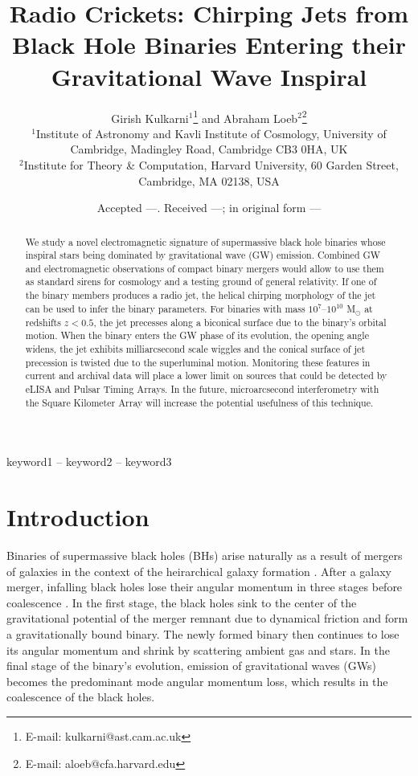 \documentclass[a4paper,fleqn,usenatbib]{mnras}
\title[Chirping Jets from Black Hole Binaries]{Radio Crickets:
  Chirping Jets from Black Hole Binaries Entering their Gravitational
  Wave Inspiral}
\author[Kulkarni and Loeb]{
Girish Kulkarni$^{1}$\thanks{E-mail: kulkarni@ast.cam.ac.uk}
and Abraham Loeb$^{2}$\thanks{E-mail: aloeb@cfa.harvard.edu}
\\
$^{1}$Institute of Astronomy and Kavli
  Institute of Cosmology, University of Cambridge, Madingley Road,
  Cambridge CB3 0HA, UK\\ 
$^{2}$Institute for Theory \& Computation,
  Harvard University, 60 Garden Street, Cambridge, MA 02138, USA\\ 
}
\date{Accepted ---. Received ---; in original form ---}
\begin{document}
\label{firstpage}
\pagerange{\pageref{firstpage}--\pageref{lastpage}}
\maketitle

\begin{abstract}
  We study a novel electromagnetic signature of supermassive black
  hole binaries whose inspiral stars being dominated by gravitational
  wave (GW) emission. Combined GW and electromagnetic observations of
  compact binary mergers would allow to use them as standard sirens
  for cosmology and a testing ground of general relativity.  If one of
  the binary members produces a radio jet, the helical chirping
  morphology of the jet can be used to infer the binary parameters.
  For binaries with mass $10^7$--$10^{10}$ M$_\odot$ at redshifts
  $z<0.5$, the jet precesses along a biconical surface due to the
  binary's orbital motion.  When the binary enters the GW phase of its
  evolution, the opening angle widens, the jet exhibits milliarcsecond
  scale wiggles and the conical surface of jet precession is twisted
  due to the superluminal motion.  Monitoring these features in
  current and archival data will place a lower limit on sources that
  could be detected by eLISA and Pulsar Timing Arrays.  In the future,
  microarcsecond interferometry with the Square Kilometer Array will
  increase the potential usefulness of this technique.
\end{abstract}

\begin{keywords}
keyword1 -- keyword2 -- keyword3
\end{keywords}

\section{Introduction}
\label{sec:intro}

Binaries of supermassive black holes (BHs) arise naturally as a result
of mergers of galaxies in the context of the heirarchical galaxy
formation \citep{2000MNRAS.311..576K, 2002MNRAS.336L..61H,
  2008ApJ...676...33D, 2012MNRAS.422.1306K}.  After a galaxy merger,
infalling black holes lose their angular momentum in three stages
before coalescence \citep{1980Natur.287..307B, 2005LRR.....8....8M,
  2011ASL.....4..181C}.  In the first stage, the black holes sink to
the center of the gravitational potential of the merger remnant due to
dynamical friction and form a gravitationally bound binary.  The newly
formed binary then continues to lose its angular momentum and shrink
by scattering ambient gas and stars.  In the final stage of the
binary's evolution, emission of gravitational waves (GWs) becomes the
predominant mode angular momentum loss, which results in the
coalescence of the black holes.
\end{document}
